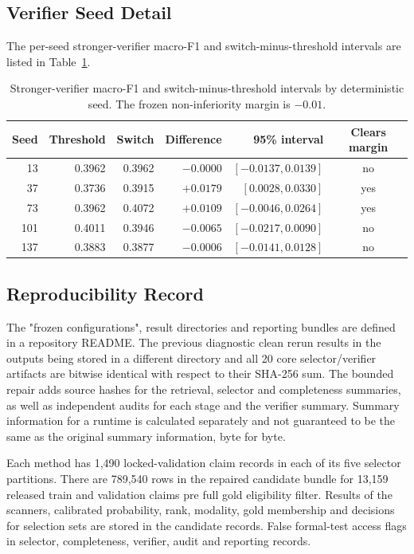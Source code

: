 \subsection{Verifier Seed Detail}

The per-seed stronger-verifier macro-F1 and switch-minus-threshold intervals are listed in Table~\ref{tab:verifier-seeds}.

\begin{table}[!tp]
\centering
\caption{Stronger-verifier macro-F1 and switch-minus-threshold intervals by deterministic seed. The frozen non-inferiority margin is $-0.01$.}
\label{tab:verifier-seeds}
\begin{tabular}{rrrrrc}
\toprule
Seed & Threshold & Switch & Difference & 95\% interval & Clears margin \\
\midrule
13  & 0.3962 & 0.3962 & $-0.0000$ & $[-0.0137, 0.0139]$ & no \\
37  & 0.3736 & 0.3915 & $+0.0179$ & $[ 0.0028, 0.0330]$ & yes \\
73  & 0.3962 & 0.4072 & $+0.0109$ & $[-0.0046, 0.0264]$ & yes \\
101 & 0.4011 & 0.3946 & $-0.0065$ & $[-0.0217, 0.0090]$ & no \\
137 & 0.3883 & 0.3877 & $-0.0006$ & $[-0.0141, 0.0128]$ & no \\
\bottomrule
\end{tabular}
\end{table}

\subsection{Reproducibility Record}

The "frozen configurations", result directories and reporting bundles are defined in a repository README. The previous diagnostic clean rerun results in the outputs being stored in a different directory and all 20 core selector/verifier artifacts are bitwise identical with respect to their SHA-256 sum. The bounded repair adds source hashes for the retrieval, selector and completeness summaries, as well as independent audits for each stage and the verifier summary. Summary information for a runtime is calculated separately and not guaranteed to be the same as the original summary information, byte for byte.

Each method has 1,490 locked-validation claim records in each of its five selector partitions. There are 789,540 rows in the repaired candidate bundle for 13,159 released train and validation claims pre full gold eligibility filter. Results of the scanners, calibrated probability, rank, modality, gold membership and decisions for selection sets are stored in the candidate records. False formal-test access flags in selector, completeness, verifier, audit and reporting records.

